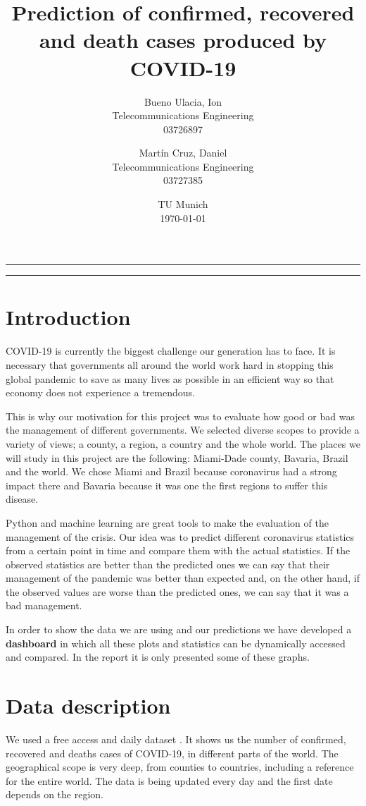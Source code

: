 \documentclass[lang=english,inputenc=utf8,fontsize=10pt]{ldvarticle}
\title{Prediction of confirmed, recovered and death cases produced by COVID-19}
\author{Bueno Ulacia, Ion\\
Telecommunications Engineering\\
03726897
\and
Martín Cruz, Daniel\\
Telecommunications Engineering\\
03727385
}
\date{TU Munich \\ \today}
\begin{document}
\maketitle
\thispagestyle{empty}

\hrule


\tableofcontents

\vspace*{1cm}
\hrule

\newpage


\section{Introduction}
COVID-19 is currently the biggest challenge our generation has to face. It is necessary that governments all around the world work hard in stopping this global pandemic to save as many lives as possible in an efficient way so that economy does not experience a tremendous.

This is why our motivation for this project was to evaluate how good or bad was the management of different governments. We selected diverse scopes to provide a variety of views; a county, a region, a country and the whole world. The places we will study in this project are the following: Miami-Dade county, Bavaria, Brazil and the world. We chose Miami and Brazil because coronavirus had a strong impact there and Bavaria because it was one the first regions to suffer this disease.

Python and machine learning are great tools to make the evaluation of the management of the crisis. Our idea was to predict different coronavirus statistics from a certain point in time and compare them with the actual statistics. If the observed statistics are better than the predicted ones we can say that their management of the pandemic was better than expected and, on the other hand, if the observed values are worse than the predicted ones, we can say that it was a bad management.

In order to show the data we are using and our predictions we have developed a \textbf{dashboard} in which all these plots and statistics can be dynamically accessed and compared. In the report it is only presented some of these graphs.


\section{Data description}
We used a free access and daily dataset \cite{Bing_covid}. It shows us the number of confirmed, recovered and deaths cases of COVID-19, in different parts of the world. The geographical scope is very deep, from counties to countries, including a reference for the entire world. The data is being updated every day and the first date depends on the region.
\end{document}
